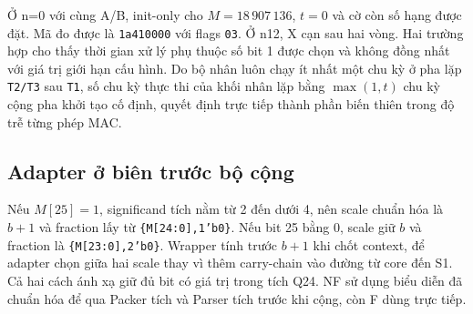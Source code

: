 Ở n=0 với cùng A/B, init-only cho $M=18\,907\,136$, $t=0$ và
cờ còn số hạng được đặt. Mã đo được là \texttt{1a410000} với
flags \texttt{03}. Ở n12, X cạn sau hai vòng. Hai trường hợp
cho thấy thời gian xử lý phụ thuộc số bit 1 được chọn và không
đồng nhất với giá trị giới hạn cấu hình. Do bộ nhân luôn chạy ít nhất một chu kỳ ở pha lặp \texttt{T2/T3} sau \texttt{T1}, số chu kỳ thực thi của khối nhân lặp bằng $\max(1,t)$ chu kỳ cộng pha khởi tạo cố định, quyết định trực tiếp thành phần biến thiên trong độ trễ từng phép MAC.

\subsection{Adapter ở biên trước bộ cộng}

Nếu $M[25]=1$, significand tích nằm từ 2 đến dưới 4, nên scale
chuẩn hóa là $b+1$ và fraction lấy từ \texttt{\{M[24:0],1'b0\}}.
Nếu bit 25 bằng 0, scale giữ $b$ và fraction là
\texttt{\{M[23:0],2'b0\}}. Wrapper tính trước $b+1$ khi chốt
context, để adapter chọn giữa hai scale thay vì thêm carry-chain
vào đường từ core đến S1. Cả hai cách ánh xạ giữ đủ bit có giá
trị trong tích Q24. NF sử dụng biểu diễn đã chuẩn hóa để qua
Packer tích và Parser tích trước khi cộng, còn F dùng trực tiếp.
